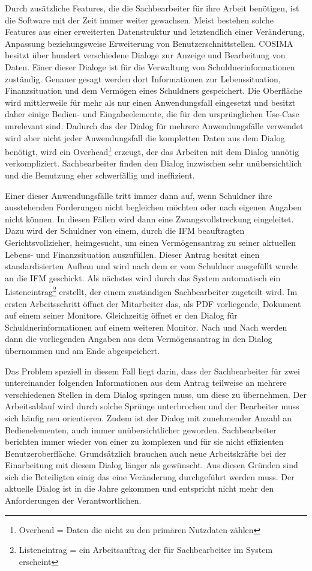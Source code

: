 Durch zusätzliche Features, die die Sachbearbeiter für ihre Arbeit benötigen, ist die Software mit der Zeit immer weiter gewachsen. Meist bestehen solche Features aus einer erweiterten Datenstruktur und letztendlich einer Veränderung, Anpassung beziehungsweise Erweiterung von Benutzerschnittstellen. COSIMA besitzt über hundert verschiedene Dialoge zur Anzeige und Bearbeitung von Daten. Einer dieser Dialoge ist für die Verwaltung von Schuldnerinformationen zuständig. Genauer gesagt werden dort Informationen zur Lebenssituation, Finanzsituation und dem Vermögen eines Schuldners gespeichert. Die Oberfläche wird mittlerweile für mehr als nur einen Anwendungsfall eingesetzt und besitzt daher einige Bedien- und Eingabeelemente, die für den ursprünglichen Use-Case unrelevant sind. Dadurch das der Dialog für mehrere Anwendungsfälle verwendet wird aber nicht jeder Anwendungsfall die kompletten Daten aus dem Dialog benötigt, wird ein Overhead\footnote{Overhead = Daten die nicht zu den primären Nutzdaten zählen} erzeugt, der das Arbeiten mit dem Dialog unnötig verkompliziert. Sachbearbeiter finden den Dialog inzwischen sehr unübersichtlich und die Benutzung eher schwerfällig und ineffizient.

Einer dieser Anwendungsfälle tritt immer dann auf, wenn Schuldner ihre ausstehenden Forderungen nicht begleichen möchten oder nach eigenen Angaben nicht können. In diesen Fällen wird dann eine Zwangsvollstreckung eingeleitet. Dazu wird der Schuldner von einem, durch die IFM beauftragten Gerichtsvollzieher, heimgesucht, um einen Vermögensantrag zu seiner aktuellen Lebens- und Finanzsituation auszufüllen. Dieser Antrag besitzt einen standardisierten Aufbau und wird nach dem er vom Schuldner ausgefüllt wurde an die IFM geschickt. Als nächstes wird durch das System automatisch ein Listeneintrag\footnote{Listeneintrag = ein Arbeitsauftrag der für Sachbearbeiter im System erscheint} erstellt, der einem zuständigen Sachbearbeiter zugeteilt wird. Im ersten Arbeitsschritt öffnet der Mitarbeiter das, als PDF vorliegende, Dokument auf einem seiner Monitore. Gleichzeitig öffnet er den Dialog für Schuldnerinformationen auf einem weiteren Monitor. Nach und Nach werden dann die vorliegenden Angaben aus dem Vermögensantrag in den Dialog übernommen und am Ende abgespeichert. 

Das Problem speziell in diesem Fall liegt darin, dass der Sachbearbeiter für zwei untereinander folgenden Informationen aus dem Antrag teilweise an mehrere verschiedenen Stellen in dem Dialog springen muss, um diese zu übernehmen. Der Arbeitsablauf wird durch solche Sprünge unterbrochen und der Bearbeiter muss sich häufig neu orientieren. Zudem ist der Dialog mit zunehmender Anzahl an Bedienelementen, auch immer unübersichtlicher geworden. Sachbearbeiter berichten immer wieder von einer zu komplexen und für sie nicht effizienten Benutzeroberfläche. Grundsätzlich brauchen auch neue Arbeitskräfte bei der Einarbeitung mit diesem Dialog länger als gewünscht. Aus diesen Gründen sind sich die Beteiligten einig das eine Veränderung durchgeführt werden muss. Der aktuelle Dialog ist in die Jahre gekommen und entspricht nicht mehr den Anforderungen der Verantwortlichen.



